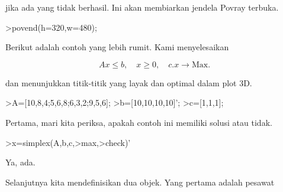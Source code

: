 \documentclass[a4paper,10pt]{article}
\begin{document}
\begin{eulernotebook}
\begin{eulercomment}
\begin{eulercomment}
\begin{eulercomment}
\begin{eulercomment}
\begin{eulercomment}
\begin{eulercomment}
\begin{eulercomment}
\begin{eulercomment}
\begin{eulercomment}
\begin{eulercomment}
\begin{eulercomment}
jika ada yang tidak berhasil. Ini akan membiarkan jendela Povray
terbuka.
\end{eulercomment}
\begin{eulerprompt}
>povend(h=320,w=480);
\end{eulerprompt}
\begin{eulercomment}
Berikut adalah contoh yang lebih rumit. Kami menyelesaikan

\end{eulercomment}
\begin{eulerformula}
\[
Ax \le b, \quad x \ge 0, \quad c.x \to \text{Max.}
\]
\end{eulerformula}
\begin{eulercomment}
dan menunjukkan titik-titik yang layak dan optimal dalam plot 3D.
\end{eulercomment}
\begin{eulerprompt}
>A=[10,8,4;5,6,8;6,3,2;9,5,6];
>b=[10,10,10,10]';
>c=[1,1,1];
\end{eulerprompt}
\begin{eulercomment}
Pertama, mari kita periksa, apakah contoh ini memiliki solusi atau
tidak.
\end{eulercomment}
\begin{eulerprompt}
>x=simplex(A,b,c,>max,>check)'
\end{eulerprompt}
\begin{euleroutput}
  [0,  1,  0.5]
\end{euleroutput}
\begin{eulercomment}
Ya, ada.


Selanjutnya kita mendefinisikan dua objek. Yang pertama adalah pesawat


\end{eulercomment}
\end{eulercomment}
\end{eulercomment}
\end{eulercomment}
\end{eulercomment}
\end{eulercomment}
\end{eulercomment}
\end{eulercomment}
\end{eulercomment}
\end{eulercomment}
\end{eulercomment}
\end{eulernotebook}
\end{document}
